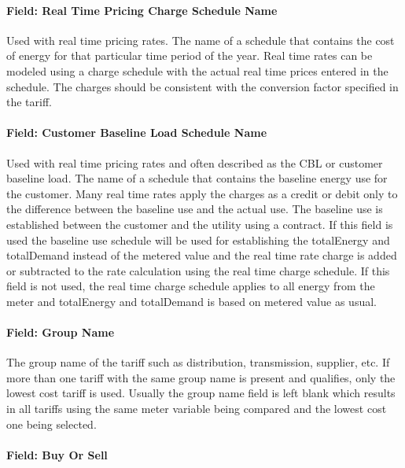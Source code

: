 \paragraph{Field: Real Time Pricing Charge Schedule Name}\label{field-real-time-pricing-charge-schedule-name}

Used with real time pricing rates. The name of a schedule that contains the cost of energy for that particular time period of the year. Real time rates can be modeled using a charge schedule with the actual real time prices entered in the schedule. The charges should be consistent with the conversion factor specified in the tariff.

\paragraph{Field: Customer Baseline Load Schedule Name}\label{field-customer-baseline-load-schedule-name}

Used with real time pricing rates and often described as the CBL or customer baseline load. The name of a schedule that contains the baseline energy use for the customer. Many real time rates apply the charges as a credit or debit only to the difference between the baseline use and the actual use. The baseline use is established between the customer and the utility using a contract. If this field is used the baseline use schedule will be used for establishing the totalEnergy and totalDemand instead of the metered value and the real time rate charge is added or subtracted to the rate calculation using the real time charge schedule. If this field is not used, the real time charge schedule applies to all energy from the meter and totalEnergy and totalDemand is based on metered value as usual.

\paragraph{Field: Group Name}\label{field-group-name}

The group name of the tariff such as distribution, transmission, supplier, etc. If more than one tariff with the same group name is present and qualifies, only the lowest cost tariff is used. Usually the group name field is left blank which results in all tariffs using the same meter variable being compared and the lowest cost one being selected.

\paragraph{Field: Buy Or Sell}\label{field-buy-or-sell}

